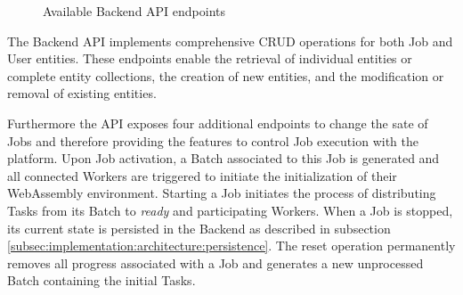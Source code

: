 \begin{figure}[bth]
    \myfloatalign
     \quad \quad
    \caption{Available Backend \ac{API} endpoints}
    \label{fig:implementation:backend}
\end{figure}

The Backend \ac{API} implements comprehensive \ac{CRUD} operations for both Job and User entities. These endpoints enable the retrieval of individual entities or complete entity collections, the creation of new entities, and the modification or removal of existing entities.

Furthermore the \ac{API} exposes four additional endpoints to change the sate of Jobs and therefore providing the features to control Job execution with the platform. Upon Job activation, a Batch associated to this Job is generated and all connected Workers are triggered to initiate the initialization of their WebAssembly environment. Starting a Job initiates the process of distributing Tasks from its Batch to \emph{ready} and participating Workers. When a Job is stopped, its current state is persisted in the Backend as described in subsection \ref{subsec:implementation:architecture:persistence}. The reset operation permanently removes all progress associated with a Job and generates a new unprocessed Batch containing the initial Tasks.

